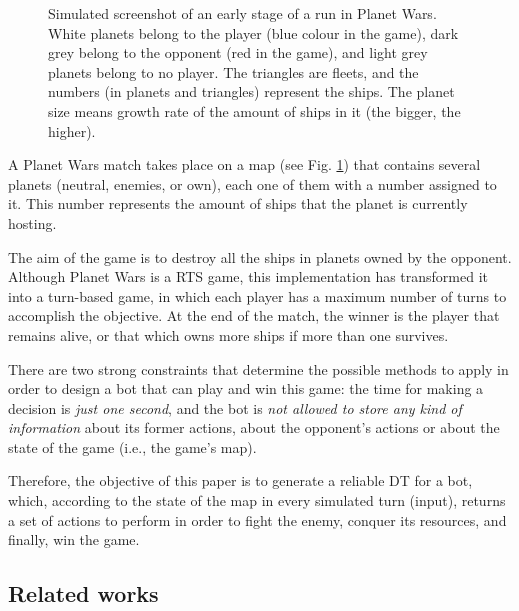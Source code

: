 \documentclass[preprint]{elsarticle}
\begin{document}
 \begin{figure}[ht]
 \begin{center}
 \end{center}
 \caption{Simulated screenshot of an early stage of a run in Planet Wars. White planets belong to the player (blue colour in the game), dark grey belong to the opponent (red in the game), and light grey planets belong to no player. The triangles are fleets, and the numbers (in planets and triangles) represent the ships. The planet size means growth rate of the amount of ships in it (the bigger, the higher).}
 \label{figura:PlanetWars1}
 \end{figure}

A Planet Wars match takes place on a map (see Fig. \ref{figura:PlanetWars1})
that contains several planets (neutral, enemies, or own), each one of
them with a number assigned to it. This number represents the amount of ships
that the planet is currently hosting. 

The aim of the game is to destroy all the ships in planets owned by
the opponent. Although Planet Wars is a RTS game, this implementation
has transformed it into a turn-based game, in which each player has a
maximum number of turns to accomplish the objective. At the end of the
match, the winner is the player that remains alive, or that which owns
more ships if more than one survives.  

There are two strong constraints that determine the possible methods
to apply in order to design a bot that can play and win this game: the time for making a decision is \textit{just one second},  
and the bot is \textit{not allowed to store any kind of information}
about its former actions, about the opponent's actions or about the
state of the game (i.e., the game's map).  

Therefore, the objective of this paper is to generate a reliable DT
for a bot, which, according to the state of the map in every simulated
turn (input), returns a set of actions to perform in order to fight
the enemy, conquer its resources, and finally, win the game.  


\subsection{Related works}
\label{sec:soa}
\end{document}
